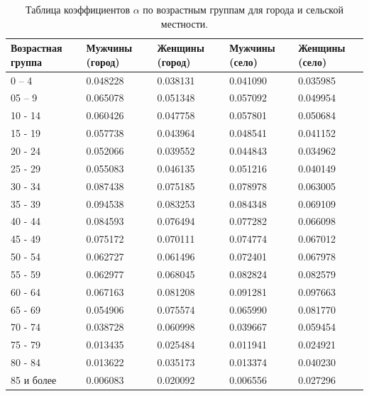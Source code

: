 \documentclass[14pt,a4paper]{article}
\begin{document}
\begin{table}[h!]
	\centering
	\setlength{\arrayrulewidth}{1pt}
	\renewcommand{\arraystretch}{1.5}
	\begin{tabularx}{\linewidth}{|X|X|X|X|X|}
		\hline
		{Возрастная группа} & 
		{Мужчины (город)} &
		{Женщины (город)} &
		{Мужчины (село)}   &
		{Женщины (село)} \\
		\hline
		0 – 4 & 0.048228 & 0.038131 & 0.041090 & 0.035985 \\ \hline
		05 – 9 & 0.065078 & 0.051348 & 0.057092 & 0.049954 \\ \hline
		10 - 14 & 0.060426 & 0.047758 & 0.057801 & 0.050684 \\ \hline
		15 - 19 & 0.057738 & 0.043964 & 0.048541 & 0.041152 \\ \hline
		20 - 24 & 0.052066 & 0.039552 & 0.044843 & 0.034962 \\ \hline
		25 - 29 & 0.055083 & 0.046135 & 0.051216 & 0.040149 \\ \hline
		30 - 34 & 0.087438 & 0.075185 & 0.078978 & 0.063005 \\ \hline
		35 - 39 & 0.094538 & 0.083253 & 0.084348 & 0.069109 \\ \hline
		40 - 44 & 0.084593 & 0.076494 & 0.077282 & 0.066098 \\ \hline
		45 - 49 & 0.075172 & 0.070111 & 0.074774 & 0.067012 \\ \hline
		50 - 54 & 0.062727 & 0.061496 & 0.072401 & 0.067978 \\ \hline
		55 - 59 & 0.062977 & 0.068045 & 0.082824 & 0.082579 \\ \hline
		60 - 64 & 0.067163 & 0.081208 & 0.091281 & 0.097663 \\ \hline
		65 - 69 & 0.054906 & 0.075574 & 0.065990 & 0.081770 \\ \hline
		70 - 74 & 0.038728 & 0.060998 & 0.039667 & 0.059454 \\ \hline
		75 - 79 & 0.013435 & 0.025484 & 0.011941 & 0.024921 \\ \hline
		80 - 84 & 0.013622 & 0.035173 & 0.013374 & 0.040230 \\ \hline
		85 и более & 0.006083 & 0.020092 & 0.006556 & 0.027296 \\
		\hline
	\end{tabularx}
	\caption{Таблица коэффициентов $\alpha$ по возрастным группам для города и сельской местности.}
	\label{coeff}
\end{table}


\end{document}

